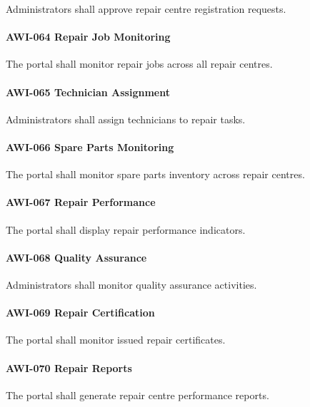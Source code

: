 Administrators shall approve repair centre registration requests.

\paragraph{AWI-064 Repair Job Monitoring}

The portal shall monitor repair jobs across all repair centres.

\paragraph{AWI-065 Technician Assignment}

Administrators shall assign technicians to repair tasks.

\paragraph{AWI-066 Spare Parts Monitoring}

The portal shall monitor spare parts inventory across repair centres.

\paragraph{AWI-067 Repair Performance}

The portal shall display repair performance indicators.

\paragraph{AWI-068 Quality Assurance}

Administrators shall monitor quality assurance activities.

\paragraph{AWI-069 Repair Certification}

The portal shall monitor issued repair certificates.

\paragraph{AWI-070 Repair Reports}

The portal shall generate repair centre performance reports.


